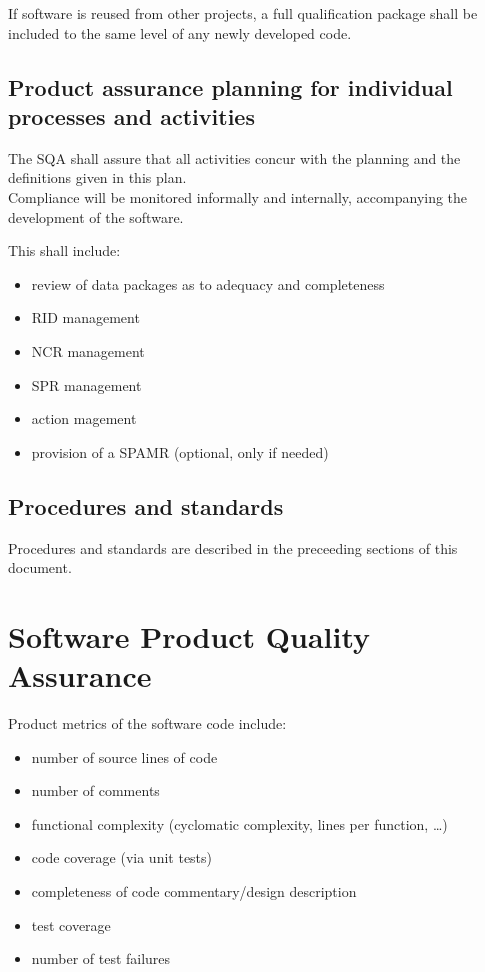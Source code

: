If software is reused from other projects, a full qualification package shall
be included to the same level of any newly developed code.



\section{Product assurance planning for individual processes and activities}

The \gls{SQA} shall assure that all activities concur with the planning and the
definitions given in this plan.\\

\noindent
Compliance will be monitored informally and internally, accompanying the
development of the software.

\begin{minipage}{\linewidth}
\noindent
This shall include:

\begin{itemize}
	\item review of data packages as to adequacy and completeness
	\item \gls{RID} management
	\item \gls{NCR} management
	\item \gls{SPR} management
	\item action magement
	\item provision of a \gls{SPAMR} (optional, only if needed)
\end{itemize}
\end{minipage}


\section{Procedures and standards}

Procedures and standards are described in the preceeding sections of this
document.




\chapter{Software Product Quality Assurance}


Product metrics of the software code include:

\begin{itemize}
	\item number of source lines of code
	\item number of comments
	\item functional complexity (cyclomatic complexity, lines per function, \ldots)
	\item code coverage (via unit tests)
	\item completeness of code commentary/design description
	\item test coverage
	\item number of test failures
\end{itemize}

